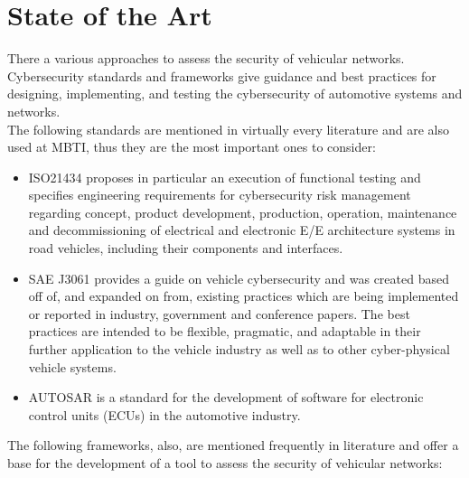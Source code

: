 \chapter{State of the Art}
\label{chp:stateoftheart}

There a various approaches to assess the security of vehicular networks.
Cybersecurity standards and frameworks give guidance and best practices for designing, implementing, 
and testing the cybersecurity of automotive systems and networks.\\

The following standards are mentioned in virtually every literature and are also used at MBTI,
thus they are the most important ones to consider:

\begin{itemize}
\item ISO21434 proposes in particular an execution of functional testing and specifies engineering requirements for cybersecurity risk management regarding concept, product development, production, operation, maintenance and decommissioning of electrical and electronic E/E architecture systems in road vehicles, including their components and interfaces\cite{iso21434}.

\item SAE J3061 provides a guide on vehicle cybersecurity and was created based off of, and expanded on from, existing practices which are being implemented or reported in industry, government and conference papers. The best practices are intended to be flexible, pragmatic, and adaptable in their further application to the vehicle industry as well as to other cyber-physical vehicle systems\cite{sae_j3061}.

\item AUTOSAR is a standard for the development of software for electronic control units (ECUs) in the automotive industry\cite{autosar}.
\end{itemize}

The following frameworks, also, are mentioned frequently in literature and offer a base 
for the development of a tool to assess the security of vehicular networks:

